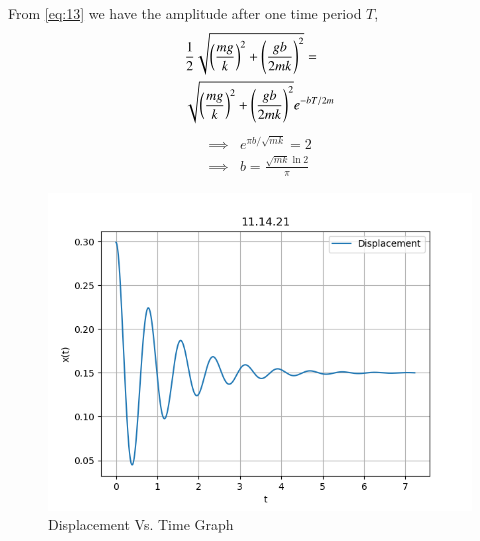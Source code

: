 \documentclass[journal,12pt,twocolumn]{IEEEtran}
\theoremstyle{remark}
\begin{document}
    From \eqref{eq:13} we have the amplitude after one time period $T$,
    \begin{align}
        \begin{split}
            &\frac{1}{2}\sqrt{\left(\frac{mg}{k}\right)^2+\left(\frac{gb}{2mk}\right)^2}= \\
            &\sqrt{\left(\frac{mg}{k}\right)^2+\left(\frac{gb}{2mk}\right)^2}e^{-bT/2m}
        \end{split}
    \end{align}
    \begin{align}
        \implies &e^{\pi b/\sqrt{mk}}=2 \\
        \implies &b=\frac{\sqrt{mk}\ln{2}}{\pi}
    \end{align}
    \begin{figure}[h]
        \centering
        \includegraphics[width=0.8\columnwidth]{ncert-physics/11/14/21/figs/11.14.21_plot.png}
        \caption{Displacement Vs. Time Graph}
    \end{figure}

\end{document}
